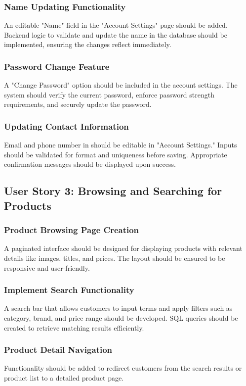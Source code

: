\documentclass[twoside,a4paper,journal]{IEEEtran}
\begin{document}
\subsubsection{Name Updating Functionality}
An editable "Name" field in the "Account Settings" page should be added.
Backend logic to validate and update the name in the database should be
implemented, ensuring the changes reflect immediately.
\subsubsection{Password Change Feature}
A "Change Password" option should be included in the account settings.
The system should verify the current password, enforce password strength
requirements, and securely update the password.
\subsubsection{Updating Contact Information}
Email and phone number in should be editable in "Account Settings."
Inputs should be validated for format and uniqueness before saving.
Appropriate confirmation messages should be displayed upon success.

\subsection{User Story 3: Browsing and Searching for Products}
\subsubsection{Product Browsing Page Creation}
A paginated interface should be designed for displaying products with relevant
details like images, titles, and prices.
The layout should be ensured to be responsive and user-friendly.
\subsubsection{Implement Search Functionality}
A search bar that allows customers to input terms and apply filters
such as category, brand, and price range should be developed.
SQL queries should be created to retrieve matching results efficiently.
\subsubsection{Product Detail Navigation}
Functionality should be added to redirect customers from the search results or
product list to a detailed product page.
\end{document}
